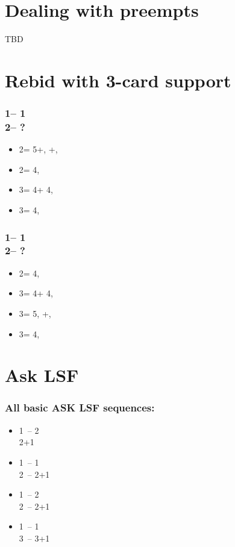 \section{\texorpdfstring{Dealing with preempts}{dealingWithPreempts}}\label{sec:dealingWithPreempts}

TBD

\section{\texorpdfstring{Rebid with 3-card support}{rebid3card}}\label{sec:rebid3card}

\subsubsection*{1\clubs -- 1\hearts \\ 2\hearts -- ?}
\begin{itemize}
    \item 2\spades = 5+\hearts, \inv+, \lsf
    \item 2\nt = 4\hearts, \inv
    \item 3\clubs = 4\hearts + 4\clubs, \inv
    \item 3\diams = 4\hearts, \gf
\end{itemize}

\subsubsection*{1\clubs -- 1\spades \\ 2\spades -- ?}
\begin{itemize}
    \item 2\nt = 4\spades, \inv
    \item 3\clubs = 4\spades + 4\clubs, \inv
    \item 3\diams = 5\spades, \inv+, \lsf
    \item 3\hearts = 4\spades, \gf
\end{itemize}

\section{\texorpdfstring{Ask LSF}{askLSF}}\label{sec:askLSF}

\subsubsection*{All basic ASK LSF sequences:}
\begin{itemize}
    \item 1\majs\ -- 2\majs\ \\ 2\majs+1\alrts
    \item 1\minor\ -- 1\majs\ \\ 2\majs\ -- 2\majs+1\alrts
    \item 1\majs\ -- 2 \\ 2\majs\ -- 2\majs+1\alrts
    \item 1\minor\ -- 1\majs \\ 3\majs\ -- 3\majs+1\alrts
\end{itemize}

